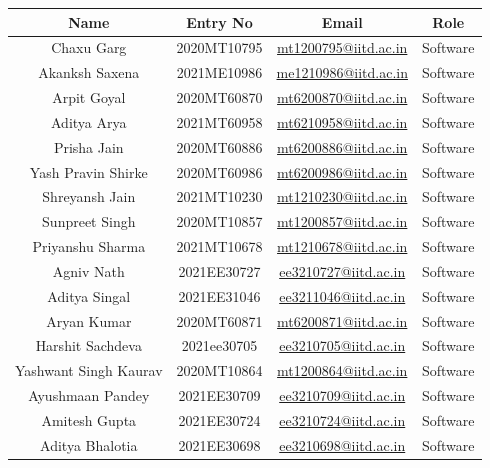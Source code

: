 \documentclass{article}
\begin{document}
\begin{table}[!ht]
\begin{center}
\begin{tabular}{|c|c|c|c|}
\hline
Name & Entry No  & Email  & Role \\
\hline
Chaxu Garg & 2020MT10795 & \href{mailto:mt1200795@iitd.ac.in}{mt1200795@iitd.ac.in} & Software \\ 
Akanksh Saxena & 2021ME10986 & \href{mailto:me1210986@iitd.ac.in}{me1210986@iitd.ac.in} & Software \\ 
Arpit Goyal & 2020MT60870 & \href{mailto:mt6200870@iitd.ac.in}{mt6200870@iitd.ac.in} & Software \\ 
Aditya Arya & 2021MT60958 & \href{mailto:mt6210958@iitd.ac.in}{mt6210958@iitd.ac.in} & Software \\ 
Prisha Jain & 2020MT60886 & \href{mailto:mt6200886@iitd.ac.in}{mt6200886@iitd.ac.in} & Software \\ 
Yash Pravin Shirke & 2020MT60986 & \href{mailto:mt6200986@iitd.ac.in}{mt6200986@iitd.ac.in} & Software \\ 
Shreyansh Jain & 2021MT10230 & \href{mailto:mt1210230@iitd.ac.in}{mt1210230@iitd.ac.in} & Software \\ 
Sunpreet Singh & 2020MT10857 & \href{mailto:mt1200857@iitd.ac.in}{mt1200857@iitd.ac.in} & Software \\ 
Priyanshu Sharma & 2021MT10678 & \href{mailto:mt1210678@iitd.ac.in}{mt1210678@iitd.ac.in} & Software \\ 
Agniv Nath & 2021EE30727 & \href{mailto:ee3210727@iitd.ac.in}{ee3210727@iitd.ac.in} & Software \\ 
Aditya Singal & 2021EE31046 & \href{mailto:ee3211046@iitd.ac.in}{ee3211046@iitd.ac.in} & Software \\ 
Aryan Kumar & 2020MT60871 & \href{mailto:mt6200871@iitd.ac.in}{mt6200871@iitd.ac.in} & Software \\ 
Harshit Sachdeva & 2021ee30705 & \href{mailto:ee3210705@iitd.ac.in}{ee3210705@iitd.ac.in} & Software \\ 
Yashwant Singh Kaurav & 2020MT10864 & \href{mailto:mt1200864@iitd.ac.in}{mt1200864@iitd.ac.in} & Software \\ 
Ayushmaan Pandey & 2021EE30709 & \href{mailto:ee3210709@iitd.ac.in}{ee3210709@iitd.ac.in} & Software \\ 
Amitesh Gupta & 2021EE30724 & \href{mailto:ee3210724@iitd.ac.in}{ee3210724@iitd.ac.in} & Software \\ 
Aditya Bhalotia & 2021EE30698 & \href{mailto:ee3210698@iitd.ac.in}{ee3210698@iitd.ac.in} & Software \\ 

\end{tabular}
\end{center}
\end{table}
\end{document}
